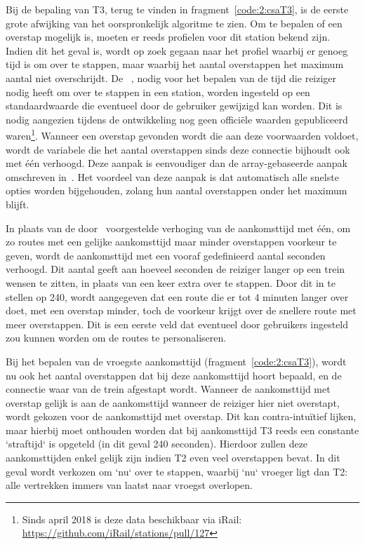 Bij de bepaling van T3, terug te vinden in fragment~\ref{code:2:csaT3}, is de eerste grote afwijking van het oorspronkelijk algoritme te zien. Om te bepalen of een overstap mogelijk is, moeten er reeds profielen voor dit station bekend zijn. Indien dit het geval is, wordt op zoek gegaan naar het profiel waarbij er genoeg tijd is om over te stappen, maar waarbij het aantal overstappen het maximum aantal niet overschrijdt. 
De ~\citep{strasser17,hannemann08}, nodig voor het bepalen van de tijd die reiziger nodig heeft om over te stappen in een station, worden ingesteld op een standaardwaarde die eventueel door de gebruiker gewijzigd kan worden. Dit is nodig aangezien tijdens de ontwikkeling nog geen officiële waarden gepubliceerd waren\footnote{Sinds april 2018 is deze data beschikbaar via iRail: \url{https://github.com/iRail/stations/pull/127}}. 
Wanneer een overstap gevonden wordt die aan deze voorwaarden voldoet, wordt de variabele die het aantal overstappen sinds deze connectie bijhoudt ook met één verhoogd. Deze aanpak is eenvoudiger dan de array-gebaseerde aanpak omschreven in~\cite{strasser17}. Het voordeel van deze aanpak is dat automatisch alle snelste opties worden bijgehouden, zolang hun aantal overstappen onder het maximum blijft. 

In plaats van de door~\cite{strasser17} voorgestelde verhoging van de aankomsttijd met één, om zo routes met een gelijke aankomsttijd maar minder overstappen voorkeur te geven, wordt de aankomsttijd met een vooraf gedefinieerd aantal seconden verhoogd. Dit aantal geeft aan hoeveel seconden de reiziger langer op een trein wensen te zitten, in plaats van een keer extra over te stappen. Door dit in te stellen op 240, wordt aangegeven dat een route die er tot 4 minuten langer over doet, met een overstap minder, toch de voorkeur krijgt over de snellere route met meer overstappen. Dit is een eerste veld dat eventueel door gebruikers ingesteld zou kunnen worden om de routes te personaliseren.

Bij het bepalen van de vroegste aankomsttijd (fragment~\ref{code:2:csaT3}), wordt nu ook het aantal overstappen dat bij deze aankomsttijd hoort bepaald, en de connectie waar van de trein afgestapt wordt. Wanneer de aankomsttijd met overstap gelijk is aan de aankomsttijd wanneer de reiziger hier niet overstapt, wordt gekozen voor de aankomsttijd met overstap. Dit kan contra-intuïtief lijken, maar hierbij moet onthouden worden dat bij aankomsttijd T3 reeds een constante `straftijd` is opgeteld (in dit geval 240 seconden). Hierdoor zullen deze aankomsttijden enkel gelijk zijn indien T2 even veel overstappen bevat. In dit geval wordt verkozen om `nu` over te stappen, waarbij `nu` vroeger ligt dan T2: alle vertrekken immers van laatst naar vroegst overlopen.

